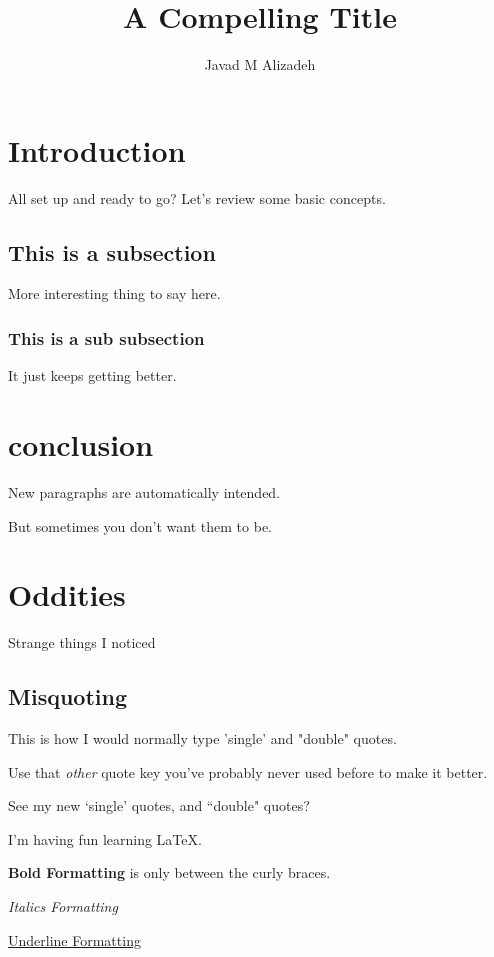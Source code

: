 \documentclass{article}
\title{A Compelling Title}
\author{Javad M Alizadeh}
\begin{document}
\maketitle

\section{Introduction}

All set up and ready to go? Let's review some basic concepts.

\subsection{This is a subsection}

More interesting thing to say here.

\subsubsection{This is a sub subsection}

It just keeps getting better.

\section{conclusion}

New paragraphs are automatically intended.

\noindent But sometimes you don't want them to be.

\section{Oddities}

Strange things I noticed

\subsection{Misquoting}

This is how I would normally type 'single' and "double" quotes.

\noindent Use that \emph{other} quote key you've probably never used before to make it better.

\noindent See my new  `single' quotes, and ``double" quotes?

I'm having fun learning \LaTeX.

\textbf{Bold Formatting} is only between the curly braces.

\emph{Italics Formatting}

\underline{Underline Formatting}
\end{document}
